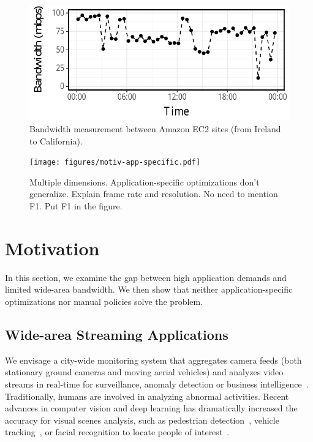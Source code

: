 \begin{figure}
  \centering
  \includegraphics[width=.95\linewidth]{figures/aws-variation.pdf}
  \caption{Bandwidth measurement between Amazon EC2 sites (from Ireland to
    California).}
  \label{fig:bw}
\end{figure}

\begin{figure}
  \centering
  \texttt{[image: figures/motiv-app-specific.pdf]}
  \caption{Multiple dimensions. Application-specific optimizations don't
    generalize. Explain frame rate and resolution. No need to mention F1. Put F1
    in the figure.}
  \label{fig:app-specific}
\end{figure}

\section{Motivation}
\label{sec:motivation}

In this section, we examine the gap between high application demands and limited
wide-area bandwidth. We then show that neither application-specific
optimizations nor manual policies solve the problem.

\subsection{Wide-area Streaming Applications}
\label{sec:wide-area-streaming}

 We envisage a city-wide monitoring system that
aggregates camera feeds (both stationary ground cameras and moving aerial
vehicles) and analyzes video streams in real-time for surveillance, anomaly
detection or business intelligence~\cite{oh2011large}. Traditionally, humans are
involved in analyzing abnormal activities. Recent advances in computer vision
and deep learning has dramatically increased the accuracy for visual scenes
analysis, such as pedestrian detection~\cite{dollar2012pedestrian}, vehicle
tracking~\cite{coifman1998real}, or facial recognition to locate people of
interest~\cite{parkhi2015deep, Lu:2015:SHF:2888116.2888245}.

